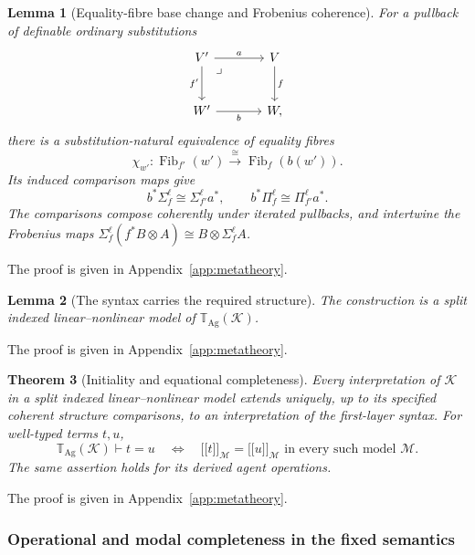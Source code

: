 \documentclass[11pt,a4paper]{article}
\numberwithin{equation}{section}
\newtheorem{theorem}{Theorem}[section]
\newtheorem{lemma}[theorem]{Lemma}
\theoremstyle{definition}
\theoremstyle{remark}
\theoremstyle{plain}
\providecommand{\llbracket}{\mathopen{[\![}}
\providecommand{\rrbracket}{\mathclose{]\!]}}
\providecommand{\sem}[1]{\llbracket #1\rrbracket}
\begin{document}
\begin{lemma}[Equality-fibre base change and Frobenius coherence]
\label{agt-lem-fibre-coherence}
For a pullback of definable ordinary substitutions
\[
\begin{tikzcd}[column sep=large,row sep=large]
V'\arrow[r,"a"]\arrow[d,"f'"']\arrow[dr,phantom,"\lrcorner",very near start]
 &V\arrow[d,"f"]\\
W'\arrow[r,"b"']&W,
\end{tikzcd}
\]
there is a substitution-natural equivalence of equality fibres
\[
 \chi_{w'}:\operatorname{Fib}_{f'}(w')
 \xrightarrow{\ \cong\ }\operatorname{Fib}_f(b(w')).
\]
Its induced comparison maps give
\[
 b^*\Sigma_f^\ell\cong\Sigma_{f'}^\ell a^*,\qquad
 b^*\Pi_f^\ell\cong\Pi_{f'}^\ell a^*.
\]
The comparisons compose coherently under iterated pullbacks, and
intertwine the Frobenius maps
$\Sigma_f^\ell(f^*B\otimes A)\cong B\otimes\Sigma_f^\ell A$.
\end{lemma}
\par\noindent The proof is given in Appendix~\ref{app:metatheory}.

\begin{lemma}[The syntax carries the required structure]
\label{agt-lem-syntactic-model}
The construction is a split indexed linear--nonlinear model of
$\mathbb T_{\mathrm{Ag}}(\mathcal K)$.
\end{lemma}
\par\noindent The proof is given in Appendix~\ref{app:metatheory}.

\begin{theorem}[Initiality and equational completeness]
\label{agt-thm-completeness}
Every interpretation of $\mathcal K$ in a split indexed linear--nonlinear
model extends uniquely, up to its specified coherent structure
comparisons, to an interpretation of the first-layer syntax. For well-typed terms $t,u$,
\[
 \mathbb T_{\mathrm{Ag}}(\mathcal K)\vdash t=u
 \quad\Longleftrightarrow\quad
 \sem t_{\mathcal M}=\sem u_{\mathcal M}
 \text{ in every such model }\mathcal M.
\]
The same assertion holds for its derived agent operations.
\end{theorem}

\par\noindent The proof is given in Appendix~\ref{app:metatheory}.

\subsubsection{Operational and modal completeness in the fixed semantics}
\end{document}
